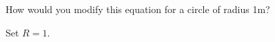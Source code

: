 How would you modify this equation for a circle of radius 1m?

\begin{solution}
Set $R=1$.
\end{solution}
